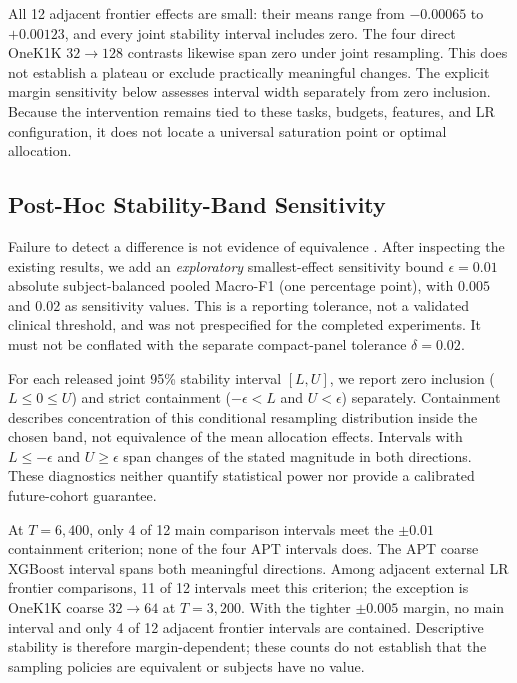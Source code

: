 

All 12 adjacent frontier effects are small: their means range from $-0.00065$
to $+0.00123$, and every joint stability interval includes zero. The four direct OneK1K
$32\rightarrow128$ contrasts likewise span zero under joint resampling. This does not
establish a plateau or exclude practically meaningful changes. The explicit
margin sensitivity below assesses interval width separately from zero inclusion.
Because the intervention remains tied to these tasks, budgets, features, and LR
configuration, it does not locate a universal saturation point or optimal allocation.

\subsection{Post-Hoc Stability-Band Sensitivity}
\label{sec:appendix:equivalence}

Failure to detect a difference is not evidence of equivalence
\citep{lakens2017equivalence}. After inspecting the existing results, we add an
\emph{exploratory} smallest-effect sensitivity bound $\epsilon=0.01$ absolute
subject-balanced pooled Macro-F1 (one percentage point), with $0.005$ and $0.02$
as sensitivity values. This is a reporting tolerance, not a validated clinical
threshold, and was not prespecified for the completed experiments. It must not
be conflated with the separate compact-panel tolerance $\delta=0.02$.

For each released joint 95\% stability interval $[L,U]$, we report zero inclusion
($L\leq0\leq U$) and strict containment ($-\epsilon<L$ and $U<\epsilon$)
separately. Containment describes concentration of this conditional resampling
distribution inside the chosen band, not equivalence of the mean allocation
effects. Intervals with $L\leq-\epsilon$ and $U\geq\epsilon$ span changes of
the stated magnitude in both directions. These diagnostics neither quantify
statistical power nor provide a calibrated future-cohort guarantee.



At $T=6{,}400$, only 4 of 12 main comparison intervals meet the $\pm0.01$
containment criterion; none of the four APT intervals does. The APT coarse
XGBoost interval spans both meaningful directions. Among adjacent external LR
frontier comparisons, 11 of 12 intervals meet this criterion; the exception is
OneK1K coarse $32\rightarrow64$ at $T=3{,}200$. With the tighter $\pm0.005$
margin, no main interval and only 4 of 12 adjacent frontier intervals are
contained. Descriptive stability is therefore margin-dependent; these counts
do not establish that the sampling policies are equivalent or subjects have no value.

